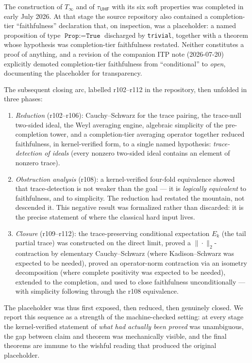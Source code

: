 \documentclass[11pt,a4paper]{amsart}
\theoremstyle{plain}
\theoremstyle{definition}
\newcommand{\Tinf}{T_\infty}
\newcommand{\tuhf}{\tau_{\mathsf{UHF}}}
\begin{document}
The construction of $\Tinf$ and of $\tuhf$ with its six soft properties
was completed in early July 2026. At that stage the source repository also
contained a completion-tier ``faithfulness'' declaration that, on
inspection, was a placeholder: a named proposition of type
$\texttt{Prop} := \texttt{True}$ discharged by \texttt{trivial}, together
with a theorem whose hypothesis was completion-tier faithfulness restated.
Neither constitutes a proof of anything, and a revision of the companion
ITP note (2026-07-20) explicitly demoted completion-tier faithfulness from
``conditional'' to \emph{open}, documenting the placeholder for
transparency.

The subsequent closing arc, labelled r102--r112 in the repository, then
unfolded in three phases:

\begin{enumerate}[leftmargin=2.4em, itemsep=2pt]
\item \emph{Reduction} (r102--r106): Cauchy--Schwarz for the trace
  pairing, the trace-null two-sided ideal, the Weyl averaging engine,
  algebraic simplicity of the pre-completion tower, and a completion-tier
  averaging operator together reduced faithfulness, in kernel-verified
  form, to a single named hypothesis: \emph{trace-detection of ideals}
  (every nonzero two-sided ideal contains an element of nonzero trace).
\item \emph{Obstruction analysis} (r108): a kernel-verified four-fold
  equivalence showed that trace-detection is not weaker than the goal ---
  it is \emph{logically equivalent} to faithfulness, and to simplicity.
  The reduction had restated the mountain, not descended it. This negative
  result was formalized rather than discarded: it is the precise statement
  of where the classical hard input lives.
\item \emph{Closure} (r109--r112): the trace-preserving conditional
  expectation $E_k$ (the tail partial trace) was constructed on the direct
  limit, proved a $\|\cdot\|_2$-contraction by elementary Cauchy--Schwarz
  (where Kadison--Schwarz was expected to be needed), proved an
  operator-norm contraction via an isometry decomposition (where complete
  positivity was expected to be needed), extended to the completion, and
  used to close faithfulness unconditionally --- with simplicity following
  through the r108 equivalence.
\end{enumerate}

The placeholder was thus first exposed, then reduced, then genuinely
closed. We report this sequence as a strength of the machine-checked
setting: at every stage the kernel-verified statement of \emph{what had
actually been proved} was unambiguous, the gap between claim and theorem
was mechanically visible, and the final theorems are immune to the wishful
reading that produced the original placeholder.
\end{document}
